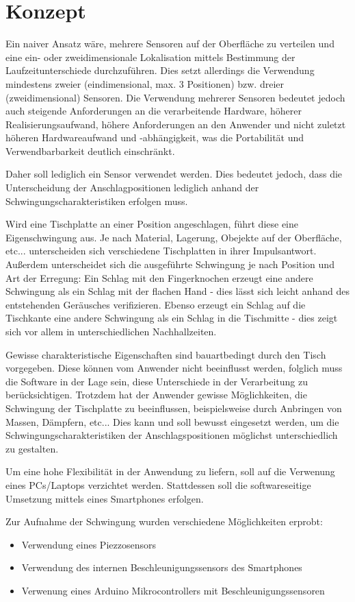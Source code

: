 \section{Konzept}
Ein naiver Ansatz wäre, mehrere Sensoren auf der Oberfläche zu verteilen und eine ein- oder zweidimensionale Lokalisation mittels Bestimmung der Laufzeitunterschiede durchzuführen.
Dies setzt allerdings die Verwendung mindestens zweier (eindimensional, max. 3 Positionen) bzw. dreier (zweidimensional) Sensoren. 
Die Verwendung mehrerer Sensoren bedeutet jedoch auch steigende Anforderungen an die verarbeitende Hardware, höherer Realisierungsaufwand, höhere Anforderungen an den Anwender und nicht zuletzt höheren Hardwareaufwand und -abhängigkeit, was die Portabilität und Verwendbarbarkeit deutlich einschränkt.

Daher soll lediglich ein Sensor verwendet werden. Dies bedeutet jedoch, dass die Unterscheidung der Anschlagpositionen lediglich anhand der Schwingungscharakteristiken erfolgen muss.

Wird eine Tischplatte an einer Position angeschlagen, führt diese eine Eigenschwingung aus.
Je nach Material, Lagerung, Obejekte auf der Oberfläche, etc... unterscheiden sich verschiedene Tischplatten in ihrer Impulsantwort.
Außerdem unterscheidet sich die ausgeführte Schwingung je nach Position und Art der Erregung: 
Ein Schlag mit den Fingerknochen erzeugt eine andere Schwingung als ein Schlag mit der flachen Hand - dies lässt sich leicht anhand des entstehenden Geräusches verifizieren.
Ebenso erzeugt ein Schlag auf die Tischkante eine andere Schwingung als ein Schlag in die Tischmitte - dies zeigt sich vor allem in unterschiedlichen Nachhallzeiten.

Gewisse charakteristische Eigenschaften sind bauartbedingt durch den Tisch vorgegeben. 
Diese können vom Anwender nicht beeinflusst werden, folglich muss die Software in der Lage sein, diese Unterschiede in der Verarbeitung zu berücksichtigen. 
Trotzdem hat der Anwender gewisse Möglichkeiten, die Schwingung der Tischplatte zu beeinflussen, beispielsweise durch Anbringen von Massen, Dämpfern, etc... 
Dies kann und soll bewusst eingesetzt werden, um die Schwingungscharakteristiken der Anschlagspositionen möglichst unterschiedlich zu gestalten.  

Um eine hohe Flexibilität in der Anwendung zu liefern, soll auf die Verwenung eines PCs/Laptops verzichtet werden. Stattdessen soll die softwareseitige Umsetzung mittels eines Smartphones erfolgen.

Zur Aufnahme der Schwingung wurden verschiedene Möglichkeiten erprobt:
\begin{itemize}
	\item Verwendung eines Piezzosensors
	\item Verwendung des internen Beschleunigungssensors des Smartphones
	\item Verwenung eines Arduino Mikrocontrollers mit Beschleunigungssensoren  
\end{itemize}

